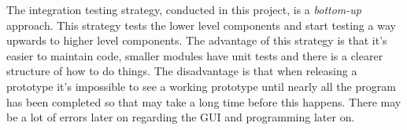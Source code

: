 The integration testing strategy, conducted in this project, is a \textit{bottom-up} approach. This strategy tests the lower level components and start testing a way upwards to higher level components. The advantage of this strategy is that it's easier to maintain code, smaller modules have unit tests and there is a clearer structure of how to do things. The disadvantage is that when releasing a prototype it's impossible to see a working prototype until nearly all the program has been completed so that may take a long time before this happens. There may be a lot of errors later on regarding the GUI and programming later on.
